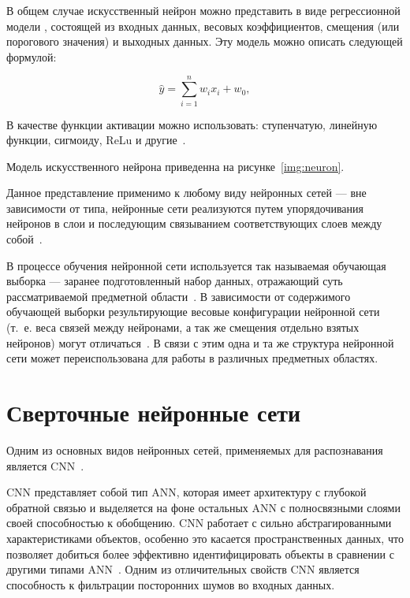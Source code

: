 
В общем случае искусственный нейрон можно представить в виде регрессионной модели \cite{activationfuncs}, состоящей из входных данных, весовых коэффициентов, смещения (или порогового значения) и выходных данных. Эту модель можно описать следующей формулой:

\begin{equation}
	\label{eq:nn0}
	\hat{y} = \sum_{i=1}^{n}w_ix_i + w_0,
\end{equation}

В качестве функции активации можно использовать: ступенчатую, линейную функции, сигмоиду, ReLu и другие~\cite{activationfuncs}.

Модель искусственного нейрона приведенна на рисунке~\ref{img:neuron}.


Данное представление применимо к любому виду нейронных сетей --- вне зависимости от типа, нейронные сети реализуются путем упорядочивания нейронов в слои и последующим связыванием соответствующих слоев между собой~\cite{ann}.

В процессе обучения нейронной сети используется так называемая обучающая выборка --- заранее подготовленный набор данных, отражающий суть рассматриваемой предметной области~\cite{ann}. В зависимости от содержимого обучающей выборки результирующие весовые конфигурации нейронной сети (т.~е. веса связей между нейронами, а так же смещения отдельно взятых нейронов) могут отличаться~\cite{ann}. В связи с этим одна и та же структура нейронной сети может переиспользована для работы в различных предметных областях.

\section{Сверточные нейронные сети}

Одним из основных видов нейронных сетей, применяемых для распознавания является CNN~\cite{cnn}.

CNN представляет собой тип ANN, которая имеет архитектуру с глубокой обратной связью и выделяется на фоне остальных ANN с полносвязными слоями своей способностью к обобщению. CNN работает с сильно абстрагированными характеристиками объектов, особенно это касается пространственных данных, что позволяет добиться более эффективно идентифицировать объекты в сравнении с другими типами ANN~\cite{cnn}. Одним из отличительных свойств CNN является способность к фильтрации посторонних шумов во входных данных.

